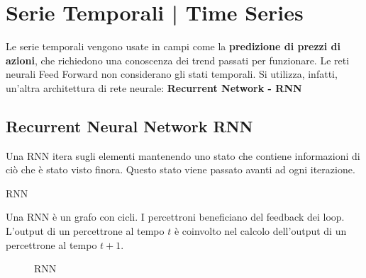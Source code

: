 \section{Serie Temporali | Time Series}
\label{sec:time-series}

Le serie temporali vengono usate in campi come la \textbf{predizione di prezzi
    di azioni}, che richiedono una conoscenza dei trend passati per funzionare. Le
reti neurali Feed Forward non considerano gli stati temporali. Si utilizza,
infatti, un'altra architettura di rete neurale: \textbf{Recurrent Network -
    RNN}

\subsection{Recurrent Neural Network RNN}

Una RNN itera sugli elementi mantenendo uno stato che contiene informazioni di
ciò che è stato visto finora. Questo stato viene passato avanti ad ogni
iterazione.

\begin{definition} RNN

\end{definition}

Una RNN è un grafo con cicli. I percettroni beneficiano del feedback dei loop.
L'output di un percettrone al tempo $t$ è coinvolto nel calcolo dell'output di
un percettrone al tempo $t+1$.

\begin{figure}[H]
    \begin{center}
    \end{center}
    \caption{RNN}
\end{figure}

